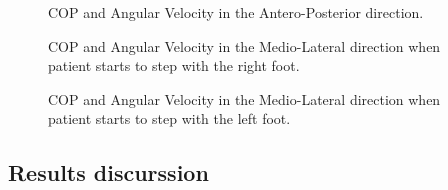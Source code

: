 \begin{figure}[H]
	\centering
	\caption{COP and Angular Velocity in the Antero-Posterior direction.}
	\label{fig:AP_GyroXtrunk}
\end{figure}
\begin{figure}[H]
	\centering
	\caption{COP and Angular Velocity in the Medio-Lateral direction when patient starts to step with the right foot.}
	\label{fig:ML_GyrotrunkNegative}
\end{figure}
\begin{figure}[H]
	\centering
	\caption{COP and Angular Velocity in the Medio-Lateral direction when patient starts to step with the left foot.}
	\label{fig:ML_GyrotrunkPositive}
\end{figure}


\subsection{Results discurssion}
